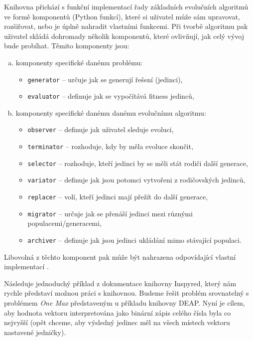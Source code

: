 Knihovna přichází s funkční implementací řady základních 
evolučních algoritmů ve formě komponentů (Python funkcí), které si uživatel
může sám upravovat, rozšiřovat, nebo je úplně nahradit vlastními funkcemi. Při
tvorbě algoritmu pak uživatel skládá dohromady několik komponentů, které
ovlivňují, jak celý vývoj bude probíhat.
Těmito komponenty jsou:
\begin{enumerate}[a)]
    \item komponenty specifické danému problému:
        \begin{itemize}
            \item \texttt{generator} -- určuje jak se generují řešení
                (jedinci),
            \item \texttt{evaluator} -- definuje jak se vypočítává fitness
                jedinců,
        \end{itemize}
    \item komponenty specifické danému danému evolučnímu algoritmu:
        \begin{itemize}
            \item \texttt{observer} -- definuje jak uživatel sleduje evoluci,
            \item \texttt{terminator} -- rozhoduje, kdy by měla evoluce
                skončit,
            \item \texttt{selector} -- rozhoduje, kteří jedinci by se měli stát
                rodiči další generace,
            \item \texttt{variator} -- definuje jak jsou potomci vytvořeni z
                rodičovských jedinců,
            \item \texttt{replacer} -- volí, kteří jedinci mají přežít do další
                generace,
            \item \texttt{migrator} -- určuje jak se přenáší jedinci mezi
                různými populacemi/generacemi,
            \item \texttt{archiver} -- definuje jak jsou jedinci ukládání mimo
                stávající populaci.
        \end{itemize}
\end{enumerate}

Libovolná z těchto komponent pak může být nahrazena odpovídající vlastní
implementací \citep{tonda2020inspyred}.

Následuje jednoduchý příklad z dokumentace knihovny Inspyred, který nám rychle
představí možnou práci s knihovnou. Budeme řešit problém srovnatelný s
problémem \emph{One Max} představeným u příkladu knihovny DEAP. Nyní je cílem,
aby hodnota vektoru interpretována jako binární zápis celého čísla byla co
nejvyšší (opět chceme, aby výsledný jedinec měl na všech místech vektoru
nastavené jedničky). 

